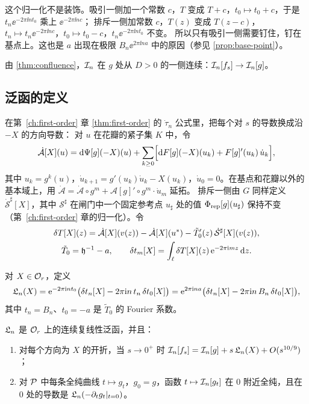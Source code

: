 \begin{remark}[归一化的重要性]\label{ch9:rem:normalization}
这个归一化不是装饰。吸引一侧加一个常数 $c$，$T$ 变成 $T+c$，$t_0\mapsto t_0+c$，于是 $t_n\ee^{-2\pi\ii nt_0}$ 乘上 $\ee^{-2\pi\ii nc}$；
排斥一侧加常数 $c$，$T(z)$ 变成 $T(z-c)$，$t_n\mapsto t_n\ee^{-2\pi\ii nc}$，$t_0\mapsto t_0-c$，$t_n\ee^{-2\pi\ii nt_0}$ 不变。
所以只有吸引一侧需要钉住，钉在基点上。这也是 $a$ 出现在极限 $B_n\ee^{2\pi\ii na}$ 中的原因（参见 \cref{prop:base-point}）。
\end{remark}

由 \cref{thm:confluence}，$\mathcal I_n$ 在 $g$ 处从 $D>0$ 的一侧连续：$\mathcal I_n[f_s]\to\mathcal I_n[g]$。

\subsection{泛函的定义}
在第~\ref{ch:first-order} 章 \cref{thm:first-order} 的 $\dot\tau_n$ 公式里，把每个对 $s$ 的导数换成沿 $-X$ 的方向导数：
对 $u$ 在花瓣的紧子集 $K$ 中，令
\begin{equation}\label{ch9:eq:Adot}
 \dot{\mathcal A}[X](u)=\mathrm{d}\Psi[g](-X)(u)+\sum_{k\ge0}\Bigl[\mathrm{d} F[g](-X)(u_k)+F[g]'(u_k)\,\dot u_k\Bigr],
\end{equation}
其中 $u_k=g^k(u)$，$\dot u_{k+1}=g'(u_k)\dot u_k-X(u_k)$，$\dot u_0=0$。在基点和花瓣以外的基本域上，用 $\dot{\mathcal A}=\dot{\mathcal A}\circ g^m+\mathcal A[g]'\circ g^m\cdot\dot u_m$ 延拓。
排斥一侧由 $G$ 同样定义 $\dot{\mathcal S}^\sharp[X]$，其中 $\mathcal S^\sharp$ 在闸门中一个固定参考点 $u_\sharp$ 处的值 $\Phi_{\mathrm{rep}}[g](u_\sharp)$ 保持不变（第~\ref{ch:first-order} 章的归一化）。令
\begin{gather*}
 \delta T[X](z)=\dot{\mathcal A}[X](v(z))-\dot{\mathcal A}[X](u^{*})-\tilde T_0'(z)\,\dot{\mathcal S}^\sharp[X](v(z)),\\
 \tilde T_0=\mathfrak h^{-1}-a,\qquad
 \delta t_m[X]=\int_\ell\delta T[X](z)\,\mathrm{e}^{-2\pi\mathrm{i} mz}\,\mathrm{d} z .
\end{gather*}

\begin{definition}\label{ch9:def:Lfun}
对 $X\in\mathcal O_r$，定义
\[
 \mathfrak L_n(X)=\mathrm{e}^{-2\pi\mathrm{i} nt_0}\bigl(\delta t_n[X]-2\pi\mathrm{i} n\,t_n\,\delta t_0[X]\bigr)
 =\mathrm{e}^{2\pi\mathrm{i} na}\bigl(\delta t_n[X]-2\pi\mathrm{i} n\,B_n\,\delta t_0[X]\bigr),
\]
其中 $t_n=B_n$、$t_0=-a$ 是 $\tilde T_0$ 的 Fourier 系数。
\end{definition}

\begin{proposition}\label{ch9:prop:linear}
$\mathfrak L_n$ 是 $\mathcal O_r$ 上的连续复线性泛函，并且：
\begin{enumerate}
\item 对每个方向为 $X$ 的开折，当 $s\to0^+$ 时 $\mathcal I_n[f_s]=\mathcal I_n[g]+s\,\mathfrak L_n(X)+O(s^{10/9})$；
\item 对 $\mathcal P$ 中每条全纯曲线 $t\mapsto g_t$，$g_0=g$，函数 $t\mapsto\mathcal I_n[g_t]$ 在 $0$ 附近全纯，且在 $0$ 处的导数是 $\mathfrak L_n(-\partial_tg_t|_{t=0})$。
\end{enumerate}
\end{proposition}

